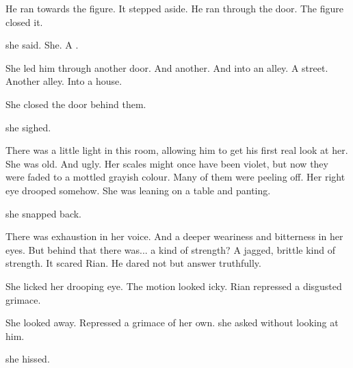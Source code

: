He ran towards the figure. 
It stepped aside. 
He ran through the door. 
The figure closed it. 

 she said. 
She. 
A \sphyle. 

She led him through another door. 
And another. 
And into an alley.
A street. 
Another alley. 
Into a house. 

She closed the door behind them. 

 she sighed. 

There was a little light in this room, allowing him to get his first real look at her. 
She was old. 
And ugly. 
Her scales might once have been violet, but now they were faded to a mottled grayish colour. 
Many of them were peeling off. 
Her right eye drooped somehow. 
She was leaning on a table and panting. 


 she snapped back. 

There was exhaustion in her voice. 
And a deeper weariness and bitterness in her eyes. 
But behind that there was... a kind of strength? 
A jagged, brittle kind of strength. 
It scared Rian. 
He dared not but answer truthfully. 

She licked her drooping eye. 
The motion looked icky. Rian repressed a disgusted grimace. 

She looked away.
Repressed a grimace of her own. 
 she asked without looking at him. 




 she hissed. 

